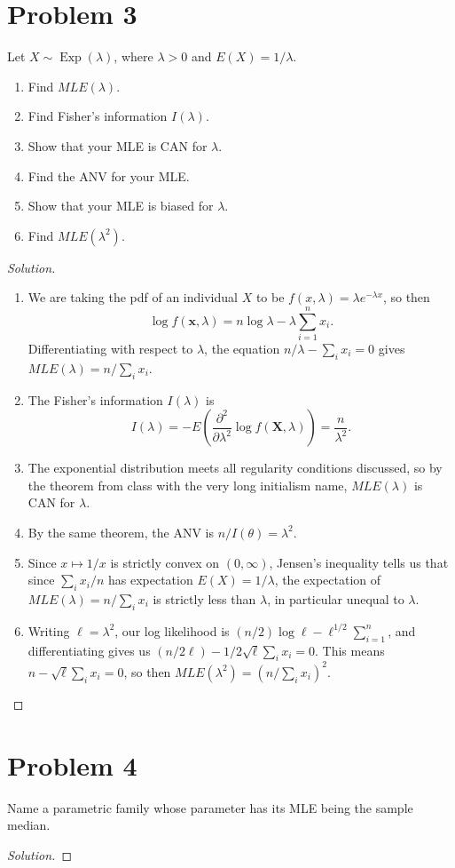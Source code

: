 \documentclass{article}
\renewcommand{\vec}[1]{\mathbf{#1}}
\begin{document}
\section*{Problem 3}
Let $X\sim\operatorname{Exp}(\lambda)$, where $\lambda > 0$ and $E(X) = 1/\lambda$.
\begin{enumerate}
\item Find $MLE(\lambda)$.
\item Find Fisher's information $I(\lambda)$.
\item Show that your MLE is CAN for $\lambda$.
\item Find the ANV for your MLE.
\item Show that your MLE is biased for $\lambda$.
\item Find $MLE(\lambda^2)$.
\end{enumerate}

\begin{proof}[Solution]
\begin{enumerate}
\item We are taking the pdf of an individual $X$ to be $f(x,\lambda) = \lambda e^{-\lambda x}$, so then
\begin{equation*}
\log f(\vec{x},\lambda) = n\log\lambda - \lambda\sum_{i = 1}^n x_i.
\end{equation*}
Differentiating with respect to $\lambda$, the equation $n/\lambda - \sum_i x_i = 0$ gives $MLE(\lambda) = n/\sum_i x_i$.
\item The Fisher's information $I(\lambda)$ is
\begin{equation*}
I(\lambda) = -E\left(\frac{\partial^2}{\partial\lambda^2}\log f(\vec{X},\lambda)\right) = \frac{n}{\lambda^2}.
\end{equation*}
\item The exponential distribution meets all regularity conditions discussed, so by the theorem from class with the very long initialism name, $MLE(\lambda)$ is CAN for $\lambda$.
\item By the same theorem, the ANV is $n/I(\theta) = \lambda^2$.
\item Since $x\mapsto 1/x$ is strictly convex on $(0,\infty)$, Jensen's inequality tells us that since $\sum_i x_i/n$ has expectation $E(X) = 1/\lambda$, the expectation of $MLE(\lambda) = n/\sum_i x_i$ is strictly less than $\lambda$, in particular unequal to $\lambda$.
\item Writing $\ell = \lambda^2$, our log likelihood is $(n/2)\log\ell - \ell^{1/2}\sum_{i = 1}^n$, and differentiating gives us $(n/2\ell) - 1/2\sqrt{\ell}\sum_i x_i = 0$. This means $n - \sqrt{\ell}\sum_i x_i = 0$, so then $MLE(\lambda^2) = (n/\sum_i x_i)^2$.
\end{enumerate}
\end{proof}


\newpage
\section*{Problem 4}
Name a parametric family whose parameter has its MLE being the sample median.

\begin{proof}[Solution]

\end{proof}
\end{document}
